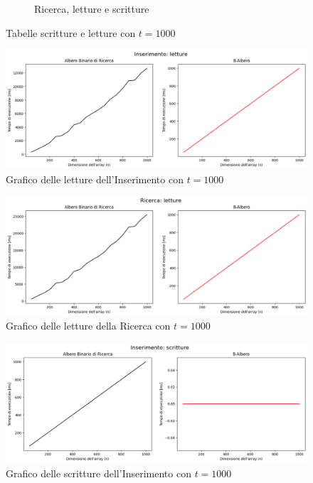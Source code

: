 \begin{figure}[H]
\begin{subfigure}[b]{0.49\textwidth}
        \caption{Ricerca, letture e scritture}
        \label{fig:tablesearchwr1000}
    \end{subfigure}
    \caption{Tabelle scritture e letture con $t=1000$}
    \label{fig:tablewr1000}
\end{figure}

\begin{figure}[H]
    \centering
    \includegraphics[width=\textwidth]{side-graphs/insert-r-t1000.png}
    \caption{Grafico delle letture dell'Inserimento con $t=1000$}
    \label{fig:sidegraphinsertread1000}
\end{figure}
    
\begin{figure}[H]
    \centering
    \includegraphics[width=\textwidth]{side-graphs/search-r-t1000.png}
    \caption{Grafico delle letture della Ricerca con $t=1000$}
    \label{fig:sidegraphsearchread1000}
\end{figure}

\begin{figure}[H]
    \centering
    \includegraphics[width=\textwidth]{side-graphs/insert-w-t1000.png}
    \caption{Grafico delle scritture dell'Inserimento con $t=1000$}
    \label{fig:sidegraphinsertwrite1000}
\end{figure}
    
